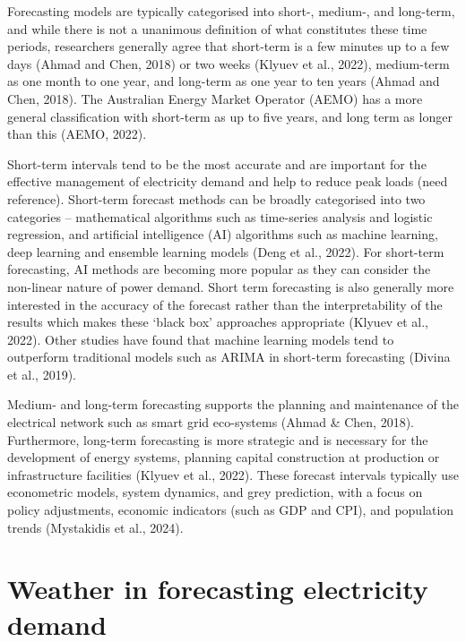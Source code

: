 \documentclass[mstat,12pt,a4paper]{unswthesis}
\begin{document}
\bigskip

Forecasting models are typically categorised into short-, medium-, and
long-term, and while there is not a unanimous definition of what
constitutes these time periods, researchers generally agree that
short-term is a few minutes up to a few days (Ahmad and Chen, 2018) or
two weeks (Klyuev et al., 2022), medium-term as one month to one year,
and long-term as one year to ten years (Ahmad and Chen, 2018). The
Australian Energy Market Operator (AEMO) has a more general
classification with short-term as up to five years, and long term as
longer than this (AEMO, 2022).

\bigskip

Short-term intervals tend to be the most accurate and are important for
the effective management of electricity demand and help to reduce peak
loads (need reference). Short-term forecast methods can be broadly
categorised into two categories -- mathematical algorithms such as
time-series analysis and logistic regression, and artificial
intelligence (AI) algorithms such as machine learning, deep learning and
ensemble learning models (Deng et al., 2022). For short-term
forecasting, AI methods are becoming more popular as they can consider
the non-linear nature of power demand. Short term forecasting is also
generally more interested in the accuracy of the forecast rather than
the interpretability of the results which makes these `black box'
approaches appropriate (Klyuev et al., 2022). Other studies have found
that machine learning models tend to outperform traditional models such
as ARIMA in short-term forecasting (Divina et al., 2019).

\bigskip

Medium- and long-term forecasting supports the planning and maintenance
of the electrical network such as smart grid eco-systems (Ahmad \& Chen,
2018). Furthermore, long-term forecasting is more strategic and is
necessary for the development of energy systems, planning capital
construction at production or infrastructure facilities (Klyuev et al.,
2022). These forecast intervals typically use econometric models, system
dynamics, and grey prediction, with a focus on policy adjustments,
economic indicators (such as GDP and CPI), and population trends
(Mystakidis et al., 2024).

\section{Weather in forecasting electricity
demand}\label{weather-in-forecasting-electricity-demand}
\end{document}
